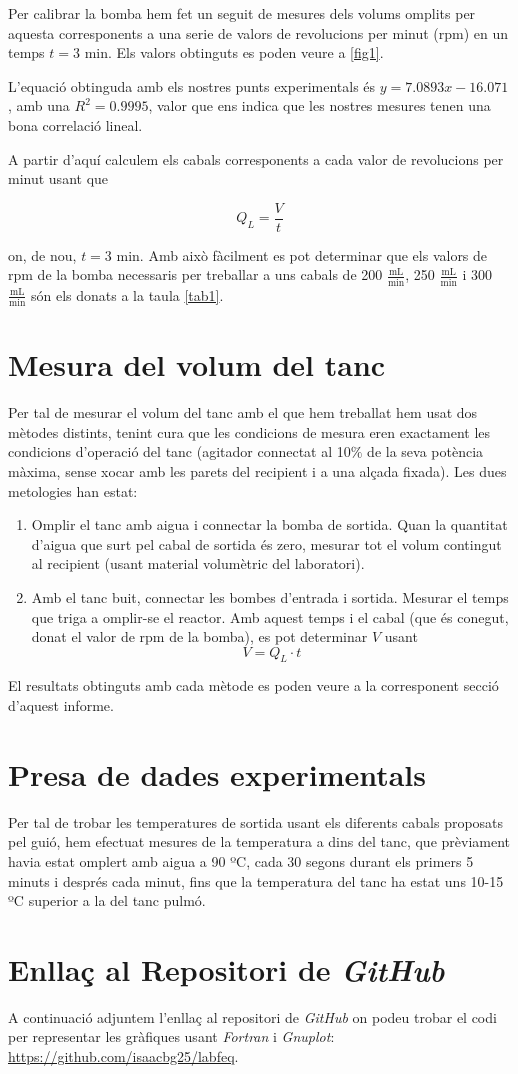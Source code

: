 \documentclass[10pt, twoside]{article}
\begin{document}
Per calibrar la bomba hem fet un seguit de mesures dels volums omplits per aquesta corresponents a una serie de valors de revolucions per minut (rpm) en un temps $t = 3$ min. Els valors obtinguts es poden veure a \ref{fig1}.

L'equació obtinguda amb els nostres punts experimentals és $y=7.0893x-16.071$, amb una $R^2 = 0.9995$, valor que ens indica que les nostres mesures tenen una bona correlació lineal.

A partir d'aquí calculem els cabals corresponents a cada valor de revolucions per minut usant que

\begin{equation}
    Q_L = \frac{V}{t}
\end{equation}

on, de nou, $t=3$ min. Amb això fàcilment es pot determinar que els valors de rpm de la bomba necessaris per treballar a uns cabals de 200 $\frac{\text{mL}}{\text{min}}$, 250 $\frac{\text{mL}}{\text{min}}$ i 300 $\frac{\text{mL}}{\text{min}}$ són els donats a la taula \ref{tab1}.

\section{Mesura del volum del tanc}
Per tal de mesurar el volum del tanc amb el que hem treballat hem usat dos mètodes distints, tenint cura que les condicions de mesura eren exactament les condicions d'operació del tanc (agitador connectat al 10$\%$ de la seva potència màxima, sense xocar amb les parets del recipient i a una alçada fixada). Les dues metologies han estat:
\begin{enumerate}
    \item Omplir el tanc amb aigua i connectar la bomba de sortida. Quan la quantitat d'aigua que surt pel cabal de sortida és zero, mesurar tot el volum contingut al recipient (usant material volumètric del laboratori).
    \item Amb el tanc buit, connectar les bombes d'entrada i sortida. Mesurar el temps que triga a omplir-se el reactor. Amb aquest temps i el cabal (que és conegut, donat el valor de rpm de la bomba), es pot determinar $V$ usant
    \begin{equation}
        V = Q_L \cdot t
    \end{equation}
\end{enumerate}
El resultats obtinguts amb cada mètode es poden veure a la corresponent secció d'aquest informe.

\section{Presa de dades experimentals}
Per tal de trobar les temperatures de sortida usant els diferents cabals proposats pel guió, hem efectuat mesures de la temperatura a dins del tanc, que prèviament havia estat omplert amb aigua a 90 ºC, cada 30 segons durant els primers 5 minuts i després cada minut, fins que la temperatura del tanc ha estat uns 10-15 ºC superior a la del tanc pulmó.

\section{Enllaç al Repositori de \textit{GitHub}}
A continuació adjuntem l'enllaç al repositori de \textit{GitHub} on podeu trobar el codi per representar les gràfiques usant \textit{Fortran} i \textit{Gnuplot}: \url{https://github.com/isaacbg25/labfeq}.
\end{document}
